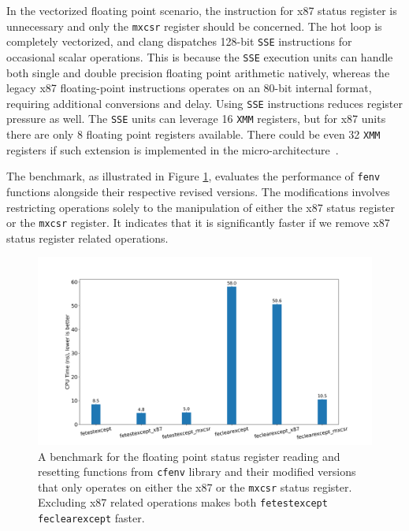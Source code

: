 \documentclass[logo,bsc,singlespacing,parskip]{infthesis}
\newcommand{\mxcsr}{\texttt{mxcsr}}
\newcommand{\xmm}{\texttt{XMM}}
\begin{document}
In the vectorized floating point scenario, the instruction for x87 status
register is unnecessary and only the \mxcsr{} register should be concerned. The
hot loop is completely vectorized, and clang dispatches 128-bit \texttt{SSE}
instructions for occasional scalar operations. This is because the \texttt{SSE}
execution units can handle both single and double precision floating point
arithmetic natively, whereas the legacy x87 floating-point instructions operates
on an 80-bit internal format, requiring additional conversions and delay. Using
\texttt{SSE} instructions reduces register pressure as well. The \texttt{SSE}
units can leverage 16 \xmm{} registers, but for x87 units there are only 8
floating point registers available. There could be even 32 \xmm{} registers if
such extension is implemented in the micro-architecture~\cite{x87-bad}. 

The benchmark, as illustrated in Figure \ref{plot_fenv}, evaluates the
performance of \texttt{fenv} functions alongside their respective revised
versions. The modifications involves restricting operations solely to the
manipulation of either the x87 status register or the \mxcsr{} register. It
indicates that it is significantly faster if we remove x87 status register
related operations. 

\begin{figure}[H]\captionsetup{name=Figure}
    \begin{center}
    \includegraphics[width=\linewidth]{image/bench_fenv.png}
    \end{center}
    \caption{A benchmark for the floating point status register reading and
resetting functions from \texttt{cfenv} library and their modified versions that
only operates on either the x87 or the \mxcsr{} status register. Excluding x87
related operations makes both \texttt{fetestexcept} \texttt{feclearexcept}
faster.}
    \label{plot_fenv}
\end{figure}
\normalsize
\end{document}
